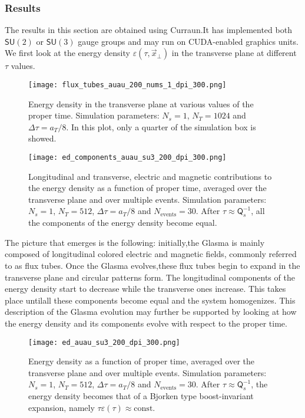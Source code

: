 \subsubsection*{Results}
The results in this section are obtained using {\sffamily Curraun}.It has implemented both $\textsf{SU}(2)$ or $\textsf{SU}(3)$ gauge groups and may run on {\sffamily CUDA}-enabled graphics units. We first look at the energy density $\varepsilon(\tau, \vec{x}_\perp)$ in the transverse plane at different $\tau$ values.

\begin{figure*}[h!]
	\texttt{[image: flux\_tubes\_auau\_200\_nums\_1\_dpi\_300.png]}
	\caption{\normalsize Energy density in the transverse plane at various values of the proper time. Simulation parameters: $N_s=1$, $N_T=1024$ and $\Delta\tau=a_T/8$. In this plot, only a quarter of the simulation box is showed.}
\end{figure*}

\begin{figure}[!hbt]
	\texttt{[image: ed\_components\_auau\_su3\_200\_dpi\_300.png]}
	\caption{\normalsize Longitudinal and transverse, electric and magnetic contributions to the energy density as a function of proper time, averaged over the transverse plane and over multiple events. Simulation parameters: $N_s=1$, $N_T=512$, $\Delta\tau=a_T/8$ and $N_\text{events}=30$. After $\tau\approx\textsf{Q}_s^{-1}$, all the components of the energy density become equal.}
\end{figure}

The picture that emerges is the following: initially,the Glasma is mainly composed of longitudinal colored electric and magnetic fields, commonly referred to as {\sffamily\color{ming}flux tubes}. Once the Glasma evolves,these flux tubes begin to expand in the transverse plane and circular patterns form. The longitudinal components of the energy density start to decrease while the transverse ones increase. This takes place untilall these components become equal and the system homogenizes. This description of the Glasma evolution may further be supported by looking at how the energy density and its components evolve with respect to the proper time. 

\begin{figure}[!hbt]
	\texttt{[image: ed\_auau\_su3\_200\_dpi\_300.png]}
	\caption{\normalsize Energy density as a function of proper time, averaged over the transverse plane and over multiple events. Simulation parameters: $N_s=1$, $N_T=512$, $\Delta\tau=a_T/8$ and $N_\text{events}=30$. After $\tau\approx\textsf{Q}_s^{-1}$, the energy density becomes that of a Bjorken type boost-invariant expansion, namely $\tau\varepsilon(\tau)\approx \text{const.}$}
\end{figure}

